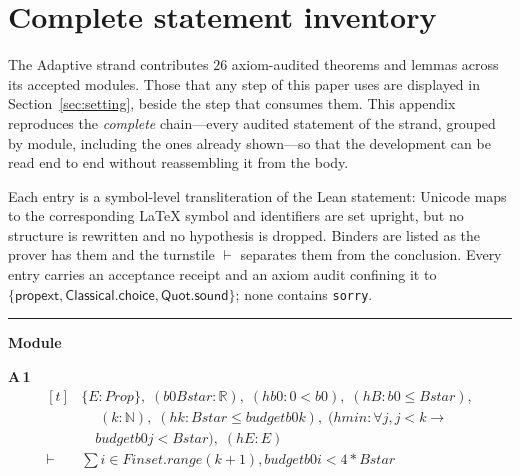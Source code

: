 \appendices
\section{Complete statement inventory}
\label{app:inventory}

The Adaptive strand contributes $26$ axiom-audited theorems and lemmas across its accepted modules. Those that any step of this paper uses are displayed in Section~\ref{sec:setting}, beside the step that consumes them. This appendix reproduces the \emph{complete} chain---every audited statement of the strand, grouped by module, including the ones already shown---so that the development can be read end to end without reassembling it from the body.

Each entry is a symbol-level transliteration of the Lean statement: Unicode maps to the corresponding \LaTeX{} symbol and identifiers are set upright, but no structure is rewritten and no hypothesis is dropped. Binders are listed as the prover has them and the turnstile $\vdash$ separates them from the conclusion. Every entry carries an acceptance receipt and an axiom audit confining it to $\{\textsf{propext},\textsf{Classical.choice},\textsf{Quot.sound}\}$; none contains \texttt{sorry}.

\vspace{4pt}\noindent\rule{\columnwidth}{0.4pt}\par\vspace{2pt}
\noindent\textbf{Module }\par\vspace{3pt}

\noindent\textbf{A\,1}\quad{}
{\footnotesize\[ \begin{aligned}[t]
&\{ \mathit{E} : \mathit{Prop}\},\; (\mathit{b0} \mathit{Bstar} : \mathbb{R} ),\; (\mathit{hb0} : 0 < \mathit{b0}),\; (\mathit{hB} : \mathit{b0} \leq \mathit{Bstar}),\\
&\quad \; (\mathit{k} : \mathbb{N} ),\; (\mathit{hk} : \mathit{Bstar} \leq \mathit{budget} \mathit{b0} \mathit{k}),\; (\mathit{hmin} : \forall \mathit{j}, \mathit{j} < \mathit{k} \to\\
&\quad \mathit{budget} \mathit{b0} \mathit{j} < \mathit{Bstar}),\; (\mathit{hE} : \mathit{E})\\
\vdash\;&\textstyle\sum \mathit{i} \in \mathit{Finset}.\mathit{range} (\mathit{k} + 1), \mathit{budget} \mathit{b0} \mathit{i} < 4 * \mathit{Bstar}
\end{aligned} \]}

